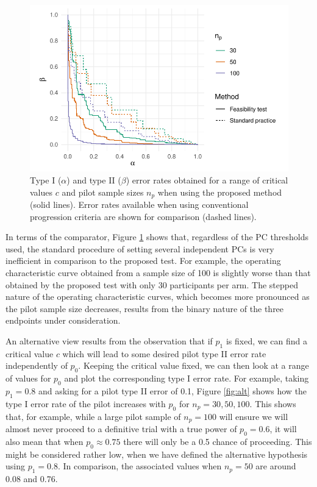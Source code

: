 \documentclass[AMA,STIX1COL]{WileyNJD-v2}
\begin{document}
\begin{figure}
\centering
\includegraphics[scale=0.8]{./Figures/ex_ocs.pdf}
\caption{Type I ($\alpha$) and type II ($\beta$) error rates obtained for a range of critical values $c$ and pilot sample sizes $n_p$ when using the proposed method (solid lines). Error rates available when using conventional progression criteria are shown for comparison (dashed lines).}
\label{fig:ex_ocs}
\end{figure}

In terms of the comparator, Figure \ref{fig:ex_ocs} shows that, regardless of the PC thresholds used, the standard procedure of setting several independent PCs is very inefficient in comparison to the proposed test. For example, the operating characteristic curve obtained from a sample size of 100 is slightly worse than that obtained by the proposed test with only 30 participants per arm. The stepped nature of the operating characteristic curves, which becomes more pronounced as the pilot sample size decreases, results from the binary nature of the three endpoints under consideration.

An alternative view results from the observation that if $p_1$ is fixed, we can find a critical value $c$ which will lead to some desired pilot type II error rate independently of $p_0$. Keeping the critical value fixed, we can then look at a range of values for $p_0$ and plot the corresponding type I error rate. For example, taking $p_1 = 0.8$ and asking for a pilot type II error of 0.1, Figure \ref{fig:alt} shows how the type I error rate of the pilot increases with $p_0$ for $n_p = 30, 50, 100$. This shows that, for example, while a large pilot sample of $n_p = 100$ will ensure we will almost never proceed to a definitive trial with a true power of $p_0 = 0.6$, it will also mean that when $p_0 \approx 0.75$ there will only be a 0.5 chance of proceeding. This might be considered rather low, when we have defined the alternative hypothesis using $p_1 = 0.8$. In comparison, the associated values when $n_p = 50$ are around 0.08 and 0.76.
\end{document}
